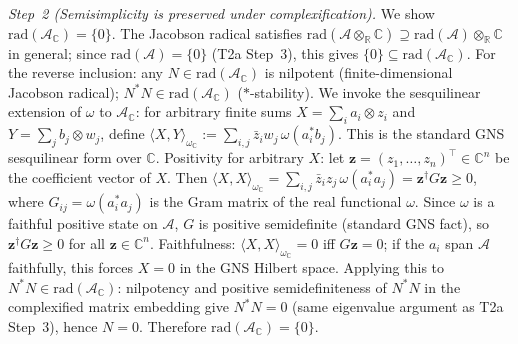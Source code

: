 \documentclass[11pt]{article}
\theoremstyle{remark}
\begin{document}
\begin{tcolorbox}[apfbox, title={T2b: Complexification and Wedderburn Decomposition}]
\textit{Step~2 (Semisimplicity is preserved under complexification).}  We show $\mathrm{rad}(\mathcal{A}_\mathbb{C}) = \{0\}$.  The Jacobson radical satisfies $\mathrm{rad}(\mathcal{A} \otimes_\mathbb{R} \mathbb{C}) \supseteq \mathrm{rad}(\mathcal{A}) \otimes_\mathbb{R} \mathbb{C}$ in general; since $\mathrm{rad}(\mathcal{A}) = \{0\}$ (T2a Step~3), this gives $\{0\} \subseteq \mathrm{rad}(\mathcal{A}_\mathbb{C})$.  For the reverse inclusion: any $N \in \mathrm{rad}(\mathcal{A}_\mathbb{C})$ is nilpotent (finite-dimensional Jacobson radical); $N^*N \in \mathrm{rad}(\mathcal{A}_\mathbb{C})$ ($*$-stability).  We invoke the sesquilinear extension of $\omega$ to $\mathcal{A}_\mathbb{C}$: for arbitrary finite sums $X = \sum_i a_i \otimes z_i$ and $Y = \sum_j b_j \otimes w_j$, define $\langle X, Y \rangle_{\omega_\mathbb{C}} := \sum_{i,j} \bar{z}_i w_j \, \omega(a_i^* b_j)$.  This is the standard GNS sesquilinear form over $\mathbb{C}$.  Positivity for arbitrary $X$: let $\mathbf{z} = (z_1, \ldots, z_n)^\top \in \mathbb{C}^n$ be the coefficient vector of $X$.  Then $\langle X, X \rangle_{\omega_\mathbb{C}} = \sum_{i,j} \bar{z}_i z_j \, \omega(a_i^* a_j) = \mathbf{z}^\dagger G \mathbf{z} \ge 0$, where $G_{ij} = \omega(a_i^* a_j)$ is the Gram matrix of the real functional $\omega$.  Since $\omega$ is a faithful positive state on $\mathcal{A}$, $G$ is positive semidefinite (standard GNS fact), so $\mathbf{z}^\dagger G \mathbf{z} \ge 0$ for all $\mathbf{z} \in \mathbb{C}^n$.  Faithfulness: $\langle X, X \rangle_{\omega_\mathbb{C}} = 0$ iff $G\mathbf{z} = 0$; if the $a_i$ span $\mathcal{A}$ faithfully, this forces $X = 0$ in the GNS Hilbert space.  Applying this to $N^*N \in \mathrm{rad}(\mathcal{A}_\mathbb{C})$: nilpotency and positive semidefiniteness of $N^*N$ in the complexified matrix embedding give $N^*N = 0$ (same eigenvalue argument as T2a Step~3), hence $N = 0$.  Therefore $\mathrm{rad}(\mathcal{A}_\mathbb{C}) = \{0\}$.


\end{tcolorbox}
\end{document}
